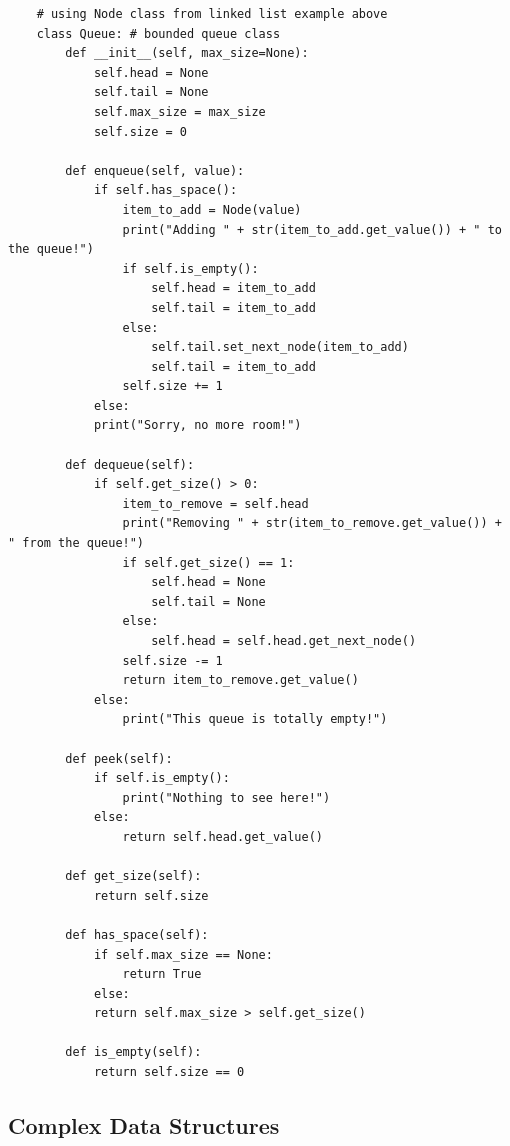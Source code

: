 \documentclass[11pt, a4paper]{article}
\begin{document}
\begin{spacing}{1.1}
	\begin{lstlisting}
	# using Node class from linked list example above
	class Queue: # bounded queue class
		def __init__(self, max_size=None):
			self.head = None
			self.tail = None
			self.max_size = max_size
			self.size = 0
		
		def enqueue(self, value):
			if self.has_space():
				item_to_add = Node(value)
				print("Adding " + str(item_to_add.get_value()) + " to the queue!")
				if self.is_empty():
					self.head = item_to_add
					self.tail = item_to_add
				else:
					self.tail.set_next_node(item_to_add)
					self.tail = item_to_add
				self.size += 1
			else:
			print("Sorry, no more room!")
		
		def dequeue(self):
			if self.get_size() > 0:
				item_to_remove = self.head
				print("Removing " + str(item_to_remove.get_value()) + " from the queue!")
				if self.get_size() == 1:
					self.head = None
					self.tail = None
				else:
					self.head = self.head.get_next_node()
				self.size -= 1
				return item_to_remove.get_value()
			else:
				print("This queue is totally empty!")
		
		def peek(self):
			if self.is_empty():
				print("Nothing to see here!")
			else:
				return self.head.get_value()
		
		def get_size(self):
			return self.size
		
		def has_space(self):
			if self.max_size == None:
				return True
			else:
			return self.max_size > self.get_size()
		
		def is_empty(self):
			return self.size == 0 \end{lstlisting} \newpage
	
	\subsection{Complex Data Structures}

\end{spacing}
\end{document}
